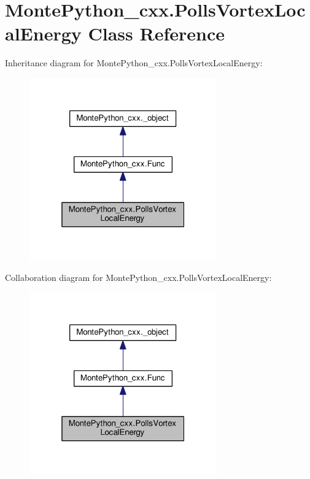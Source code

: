 \hypertarget{classMontePython__cxx_1_1PollsVortexLocalEnergy}{}\section{Monte\+Python\+\_\+cxx.\+Polls\+Vortex\+Local\+Energy Class Reference}
\label{classMontePython__cxx_1_1PollsVortexLocalEnergy}


Inheritance diagram for Monte\+Python\+\_\+cxx.\+Polls\+Vortex\+Local\+Energy\+:
\nopagebreak
\begin{figure}[H]
\begin{center}
\leavevmode
\includegraphics[width=229pt]{classMontePython__cxx_1_1PollsVortexLocalEnergy__inherit__graph}
\end{center}
\end{figure}


Collaboration diagram for Monte\+Python\+\_\+cxx.\+Polls\+Vortex\+Local\+Energy\+:
\nopagebreak
\begin{figure}[H]
\begin{center}
\leavevmode
\includegraphics[width=229pt]{classMontePython__cxx_1_1PollsVortexLocalEnergy__coll__graph}
\end{center}
\end{figure}
